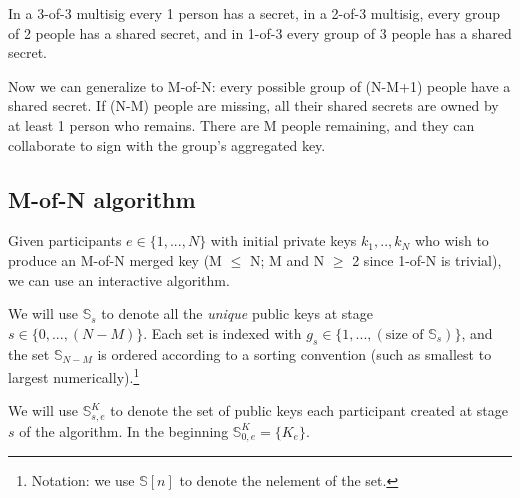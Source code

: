 In a 3-of-3 multisig every 1 person has a secret, in a 2-of-3 multisig, every group of 2 people has a shared secret, and in 1-of-3 every group of 3 people has a shared secret. 

Now we can generalize to M-of-N: every possible group of (N-M+1) people have a shared secret. If (N-M) people are missing, all their shared secrets are owned by at least 1 person who remains. There are M people remaining, and they can collaborate to sign with the group's aggregated key.


\subsection*{M-of-N algorithm}

Given participants $e \in \{1,...,N\}$ with initial private keys $k_1,..,k_N$ who wish to produce an M-of-N merged key (M $\leq$ N; M and N $\geq$ 2 since 1-of-N is trivial), we can use an interactive algorithm. 

We will use $\mathbb{S}_s$ to denote all the {\em unique} public keys at stage $s \in \{0,...,(N-M)\}$. Each set is indexed with $g_s \in \{1,...,(\textrm{size of }\mathbb{S}_s)\}$, and the set $\mathbb{S}_{N-M}$ is ordered according to a sorting convention (such as smallest to largest numerically).\footnote{Notation: we use $\mathbb{S}[n]$ to denote the n\nth element of the set.}

We will use $\mathbb{S}^K_{s,e}$ to denote the set of public keys each participant created at stage $s$ of the algorithm. In the beginning $\mathbb{S}^K_{0,e} = \{K_e\}$.


